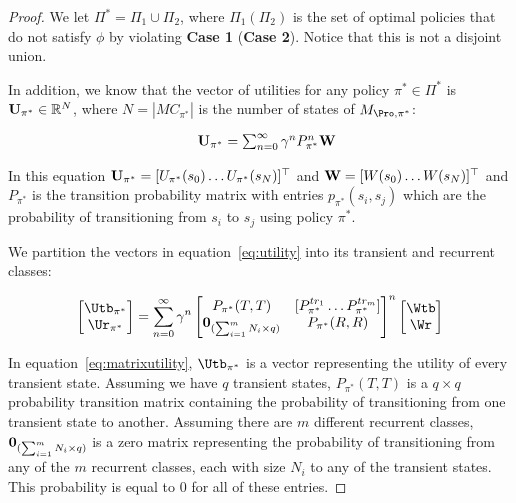 \begin{proof}
 We let $\Pi^* = \Pi_1 \cup \Pi_2$, where $\Pi_1 (\Pi_2)$ is the set of optimal policies that do not satisfy $\phi$ by violating {\bf Case 1} ({\bf Case 2}). Notice that this is not a disjoint union. 


In addition, we know that the vector of utilities for any policy $\pi^* \in \Pi^*$ is ${\bf U}_{\pi^*} \in \mathbb{R}^N$, where $N = |MC_{\pi^*}|$ is the number of states of $M_{\Pro, \pi^*}$:

\begin{equation}
\label{eq:utility}
\begin{array}{ll}
&{\bf U}_{\pi^*} = \sum_{n=0}^{\infty} \gamma^n P_{\pi^*}^n {\bf W}   
\end{array}
\end{equation}

In this equation ${\bf U}_{\pi^*} = [U_{\pi^*}(s_0) \dotsc U_{\pi^*}(s_N)]^\top$ and ${\bf W} = [W(s_0) \dotsc W(s_N)]^\top$ and $P_{\pi^*}$ is the transition probability matrix with entries $p_{\pi^*}(s_i,s_j)$ which are the probability of transitioning from $s_i$ to $s_j$ using policy $\pi^*$.

We partition the vectors in equation~\eqref{eq:utility} into its transient and recurrent classes:

\begin{equation}
\label{eq:matrixutility}
\begin{bmatrix}
\Utb_{\pi^*}\\
\Ur_{\pi^*}
\end{bmatrix} = \sum_{n=0}^{\infty} \gamma^n
\begin{bmatrix}
P_{\pi^*}(T,T) & [P_{\pi^*}^{tr_1} \dotsc  P^{tr_m}_{\pi^*}]\\
{\bf 0}_{(\sum_{i=1}^mN_i\times q)} & P_{\pi^*}(R,R)
\end{bmatrix}^n
\begin{bmatrix}
\Wtb \\
\Wr
\end{bmatrix}
\end{equation}

In equation~\eqref{eq:matrixutility}, $\Utb_{\pi^*}$ is a vector representing the utility of every transient state. Assuming we have $q$ transient states, $P_{\pi^*}(T,T)$ is a $q\times q$ probability transition matrix containing the probability of transitioning from one transient state to another. 
Assuming there are $m$ different recurrent classes, ${\bf 0}_{(\sum_{i=1}^mN_i\times q)}$ is a zero matrix representing the probability of transitioning from any of the $m$ recurrent classes, each with size $N_i$ to any of the transient states. This probability is equal to $0$ for all of these entries.



\end{proof}
